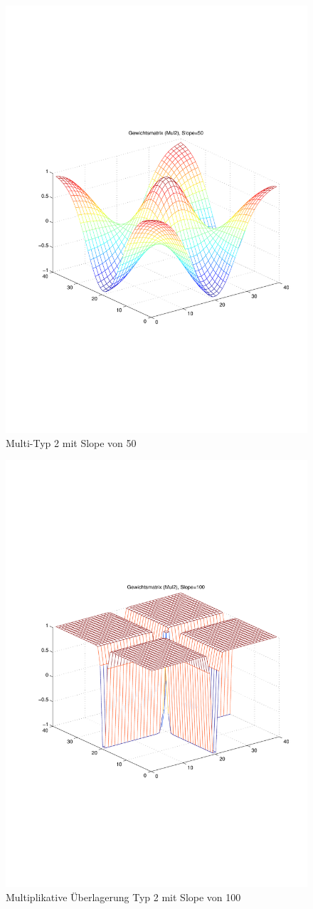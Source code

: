 \begin{figure}[hbt]
\begin{minipage}{0.48\textwidth}
		\includegraphics[trim=70 200 32 242, clip, width=\textwidth]{./Bilder/Auswertung/Gewichtsmatrix/Gewichtsmatrix_Mul2_Slope_50}
		\caption{Multi-Typ 2 mit Slope von 50}
		\label{Mul250}
	\end{minipage}
\end{figure}
\begin{figure}[hbt]
	\centering
	\includegraphics[trim=70 200 32 242, clip, width=0.48\linewidth]{./Bilder/Auswertung/Gewichtsmatrix/Gewichtsmatrix_Mul2_Slope_100}
	\caption{Multiplikative Überlagerung Typ 2 mit Slope von 100}
	\label{Mul2100}
\end{figure}

